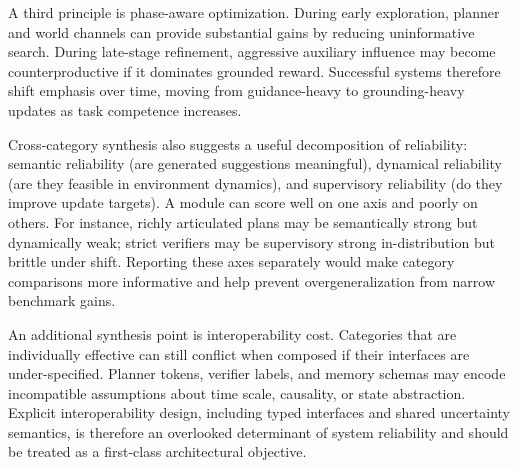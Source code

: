 \documentclass[pdflatex,sn-mathphys-num]{sn-jnl}
\begin{document}
A third principle is phase-aware optimization. During early exploration, planner and world channels can provide substantial gains by reducing uninformative search. During late-stage refinement, aggressive auxiliary influence may become counterproductive if it dominates grounded reward. Successful systems therefore shift emphasis over time, moving from guidance-heavy to grounding-heavy updates as task competence increases.

Cross-category synthesis also suggests a useful decomposition of reliability: semantic reliability (are generated suggestions meaningful), dynamical reliability (are they feasible in environment dynamics), and supervisory reliability (do they improve update targets). A module can score well on one axis and poorly on others. For instance, richly articulated plans may be semantically strong but dynamically weak; strict verifiers may be supervisory strong in-distribution but brittle under shift. Reporting these axes separately would make category comparisons more informative and help prevent overgeneralization from narrow benchmark gains.

An additional synthesis point is interoperability cost. Categories that are individually effective can still conflict when composed if their interfaces are under-specified. Planner tokens, verifier labels, and memory schemas may encode incompatible assumptions about time scale, causality, or state abstraction. Explicit interoperability design, including typed interfaces and shared uncertainty semantics, is therefore an overlooked determinant of system reliability and should be treated as a first-class architectural objective.
\end{document}
